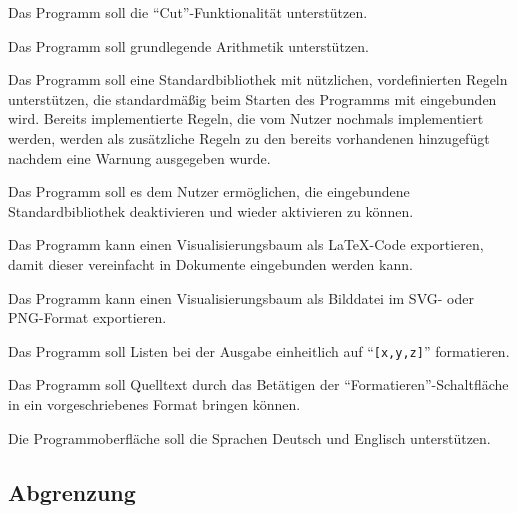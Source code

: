 \documentclass[parskip=full,11pt,twoside]{scrartcl}
\begin{document}

Das Programm soll die \enquote{Cut}-Funktionalität unterstützen.


Das Programm soll grundlegende Arithmetik unterstützen.


Das Programm soll eine Standardbibliothek mit nützlichen, vordefinierten Regeln unterstützen, die standardmäßig beim Starten des Programms mit eingebunden wird. Bereits implementierte Regeln, die vom Nutzer nochmals implementiert werden, werden als zusätzliche Regeln zu den bereits vorhandenen hinzugefügt nachdem eine Warnung ausgegeben wurde.


Das Programm soll es dem Nutzer ermöglichen, die eingebundene Standardbibliothek deaktivieren und wieder aktivieren zu können.


Das Programm kann einen Visualisierungsbaum als LaTeX-Code exportieren, damit dieser vereinfacht in Dokumente eingebunden werden kann.


Das Programm kann einen Visualisierungsbaum als Bilddatei im SVG- oder PNG-Format exportieren.


Das Programm soll Listen bei der Ausgabe einheitlich auf \enquote{\texttt{[x,y,z]}} formatieren.


Das Programm soll Quelltext durch das Betätigen der \enquote{Formatieren}-Schaltfläche in ein vorgeschriebenes Format bringen können.


Die Programmoberfläche soll die Sprachen Deutsch und Englisch unterstützen.

\subsection{Abgrenzung}
\end{document}
